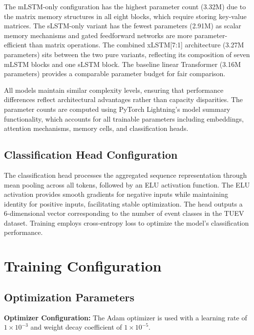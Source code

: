 The \ac{mLSTM}-only configuration has the highest parameter count (3.32M) due to the matrix memory structures in all eight blocks, which require storing key-value matrices. The \ac{sLSTM}-only variant has the fewest parameters (2.91M) as scalar memory mechanisms and gated feedforward networks are more parameter-efficient than matrix operations. The combined xLSTM[7:1] architecture (3.27M parameters) sits between the two pure variants, reflecting its composition of seven \ac{mLSTM} blocks and one \ac{sLSTM} block. The baseline linear Transformer (3.16M parameters) provides a comparable parameter budget for fair comparison.

All models maintain similar complexity levels, ensuring that performance differences reflect architectural advantages rather than capacity disparities. The parameter counts are computed using PyTorch Lightning's model summary functionality, which accounts for all trainable parameters including embeddings, attention mechanisms, memory cells, and classification heads.

\subsection{Classification Head Configuration}
\label{sec:classification_head}

The classification head processes the aggregated sequence representation through mean pooling across all tokens, followed by an \ac{ELU} activation function. The \ac{ELU} activation provides smooth gradients for negative inputs while maintaining identity for positive inputs, facilitating stable optimization. The head outputs a 6-dimensional vector corresponding to the number of event classes in the TUEV dataset. Training employs cross-entropy loss to optimize the model's classification performance.


\section{Training Configuration}
\label{sec:training_configuration}

\subsection{Optimization Parameters}
\label{sec:optimization_parameters}

\textbf{Optimizer Configuration:} The Adam optimizer is used with a learning rate of $1 \times 10^{-3}$ and weight decay coefficient of $1 \times 10^{-5}$.

